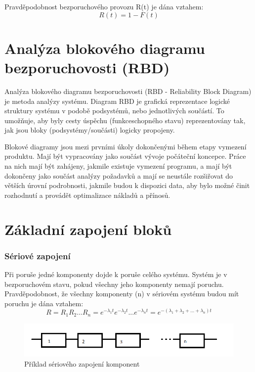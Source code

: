 \documentclass[FM,RP]{tulthesis}
\begin{document}
            Pravděpodobnost bezporuchového provozu R(t) je dána vztahem:
            $$ R(t)=1-F(t) $$
   
    \section{Analýza blokového diagramu bezporuchovosti (RBD)}

        Analýza blokového diagramu bezporuchovosti (RBD - Reliability Block Diagram) je metoda analýzy systému. 
        Diagram RBD je grafická reprezentace logické struktury systému v podobě podsystémů, nebo jednotlivých součástí. 
        To umožňuje, aby byly cesty úspěchu (funkceschopného stavu) reprezentovány tak, jak jsou bloky (podsystémy/součásti) logicky propojeny.\cite{1}

        Blokové diagramy jsou mezi prvními úkoly dokončenými během etapy vymezení produktu. 
        Mají být vypracovány jako součást vývoje počáteční koncepce. 
        Práce na nich mají být zahájeny, jakmile existuje vymezení programu, a mají být dokončeny jako součást analýzy požadavků a 
        mají se neustále rozšiřovat do větších úrovní podrobnosti, 
        jakmile budou k dispozici data, aby bylo možné činit rozhodnutí a provádět optimalizace nákladů a přínosů.\cite{2}

    \section{Základní zapojení bloků}
        \subsubsection*{Sériové zapojení}
            Při poruše jedné komponenty dojde k poruše celého systému. 
            Systém je v bezporuchovém stavu, pokud všechny jeho komponenty nemají poruchu.\cite{5}
            Pravděpodobnost, že všechny komponenty (n) v sériovém systému budou mít poruchu je dána vztahem:
            $$ R = R_{1}R_{2}...R_{n} = e^{-\lambda_{1}t}e^{-\lambda_{2}t}...e^{-\lambda_{n}t} = e^{-(\lambda_{1} + \lambda_{2} + ... +\lambda_{n})t} $$
            \begin{figure}[h]
                \centering
                \includegraphics[scale=0.75]{pic/seriove.png}
                \caption{Příklad sériového zapojení komponent} \label{Obrázek č. 2.1}
            \end{figure}
\end{document}
